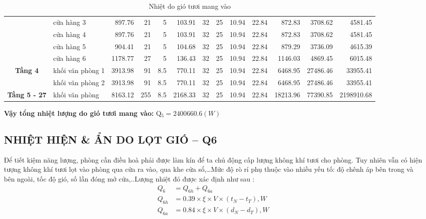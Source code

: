 \begin{landscape}
\begin{table}[H]
\begin{adjustbox}{width=1.5\textheight, height=0.4\textwidth}
\begin{tabular}{|c|l|r|r|r|r|r|r|r|r|r|r|r|}
			\cline{2-13}             & cửa hàng 3 & 897.76   & 21       & 5        & 103.91   & 32       & 25       & 10.94    & 22.84    & 872.83   & 3708.62  & 4581.45 \bigstrut\\
			\cline{2-13}             & cửa hàng 4 & 897.76   & 21       & 5        & 103.91   & 32       & 25       & 10.94    & 22.84    & 872.83   & 3708.62  & 4581.45 \bigstrut\\
			\cline{2-13}             & cửa hàng 5 & 904.41   & 21       & 5        & 104.68   & 32       & 25       & 10.94    & 22.84    & 879.29   & 3736.09  & 4615.39 \bigstrut\\
			\cline{2-13}             & cửa hàng 6 & 1178.77  & 27       & 5        & 136.43   & 32       & 25       & 10.94    & 22.84    & 1146.03  & 4869.45  & 6015.48 \bigstrut\\
			\hline
			\multirow{2}[4]{*}{\textbf{Tầng 4}} & khối văn phòng 1 & 3913.98  & 91       & 8.5      & 770.11   & 32       & 25       & 10.94    & 22.84    & 6468.95  & 27486.46 & 33955.41 \bigstrut\\
			\cline{2-13}             & khối văn phòng 2 & 3913.98  & 91       & 8.5      & 770.11   & 32       & 25       & 10.94    & 22.84    & 6468.95  & 27486.46 & 33955.41 \bigstrut\\
			\hline
			\textbf{Tầng 5 - 27} & khối văn phòng & 8163.12  & 255      & 8.5      & 2168.33  & 32       & 25       & 10.94    & 22.84    & 18213.96 & 77390.85 & 2198910.68 \bigstrut\\
			\hline
		\end{tabular}%
		\end{adjustbox}
		\caption{Nhiệt do gió tươi mang vào}
		\label{b:ndgt}%
	\end{table}%
\end{landscape}
\textbf{Vậy tổng nhiệt lượng do gió tươi mang vào:} Q$_{5} = 2 400 660.6(W)$

\subsection{NHIỆT HIỆN \& ẨN DO LỌT GIÓ -- Q{\scriptsize 6}}
Để tiết kiệm năng lượng, phòng cần điều hoà phải được làm kín để ta chủ động cấp lượng không khí tươi cho phòng. Tuy nhiên vẫn có hiện tượng không khí tươi lọt vào phòng qua cửa ra vào, qua khe cửa sổ,…Mức độ rò rỉ phụ thuộc vào nhiều yếu tố: độ chênh áp bên trong và bên ngoài, tốc độ gió, số lần đóng mở cửa,..Lượng nhiệt đó được xác định như sau :
\begin{equation*}
	\begin{split}
	Q_{6} &= Q_{6h} + Q_{6a} \\
	Q_{6h} &= 0.39 \times \xi \times V \times (t_{N} - t_{T}), W \\
	Q_{6a} &= 0.84 \times \xi \times V \times (d_{N} - d_{T}), W		
	\end{split}
\end{equation*}

